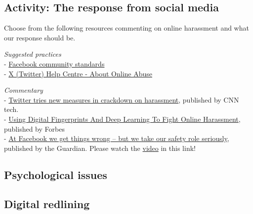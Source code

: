 \documentclass[
]{book}
\theoremstyle{definition}
\theoremstyle{definition}
\theoremstyle{definition}
\theoremstyle{definition}
\theoremstyle{remark}
\begin{document}
\hypertarget{activity-the-response-from-social-media}{%
\subsection*{Activity: The response from social media}\label{activity-the-response-from-social-media}}

\begin{reflect}
Choose from the following resources commenting on online harassment and what our response should be.

\emph{Suggested practices}\\
- \href{https://transparency.fb.com/en-gb/policies/community-standards/?source=https\%3A\%2F\%2Fwww.facebook.com\%2Fcommunitystandards\%2F}{Facebook community standards}\\
- \href{https://help.twitter.com/en/safety-and-security/cyber-bullying-and-online-abuse}{X (Twitter) Help Centre - About Online Abuse}

\emph{Commentary}\\
- \href{https://money.cnn.com/2017/02/07/technology/twitter-combat-harassment-features/index.html?iid=EL}{Twitter tries new measures in crackdown on harassment}, published by CNN tech.\\
- \href{https://www.forbes.com/sites/kalevleetaru/2017/02/06/using-digital-fingerprints-and-deep-learning-to-fight-online-harassment/?sh=49fc9bf06908}{Using Digital Fingerprints And Deep Learning To Fight Online Harassment}, published by Forbes\\
- \href{https://www.theguardian.com/commentisfree/2017/may/22/facebook-get-things-wrong-but-safety-role-seriously}{At Facebook we get things wrong -- but we take our safety role seriously}, published by the Guardian. Please watch the \href{https://www.theguardian.com/news/video/2017/may/21/the-facebook-files-sex-violence-and-hate-speech-video-explainer}{video} in this link!
\end{reflect}

\hypertarget{psychological-issues}{%
\subsection*{Psychological issues}\label{psychological-issues}}

\hypertarget{digital-redlining}{%
\subsection*{Digital redlining}\label{digital-redlining}}
\end{document}
